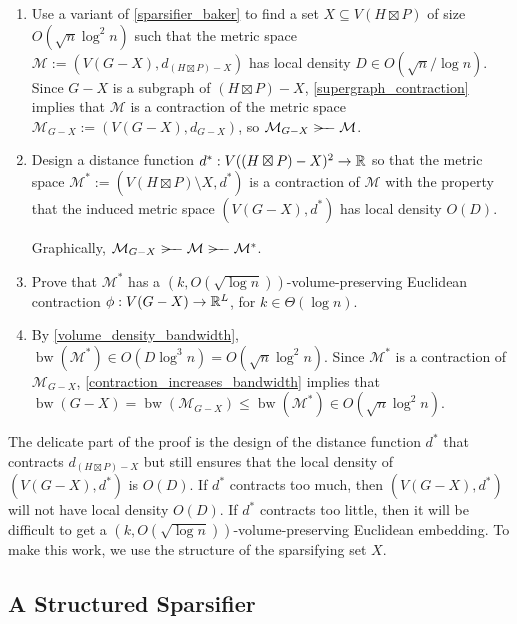 \documentclass{patmorin}
\renewcommand{\le}{\leqslant}
\newcommand{\david}[1]{{\color{orange} David: #1}}
\newcommand{\pat}[1]{\textcolor{Blue}{Pat: #1}}
\DeclareMathOperator{\bw}{bw}
\begin{document}
\begin{enumerate}
  \item Use a variant of \cref{sparsifier_baker} to find a set $X\subseteq V(H\boxtimes P)$ of size $O(\sqrt{n}\log^2 n)$ such that the metric space $\mathcal{M}:=(V(G-X),d_{(H\boxtimes P)-X})$ has local density $D\in O(\sqrt{n}/\log n)$.  Since $G-X$ is a subgraph of $(H\boxtimes P)-X$, \cref{supergraph_contraction} implies that $\mathcal{M}$ is a contraction of the metric space $\mathcal{M}_{G-X}:=(V(G-X),d_{G-X})$, so $\mathcal{M}_{G-X}\rightbroom\mathcal{M}$.

  \item Design a distance function $d^*:V((H\boxtimes P)-X)^2\to\mathbb{R}$ so that the metric space $\mathcal{M}^*:=(V(H\boxtimes P)\setminus X,d^*)$ is a contraction of $\mathcal{M}$ with the property that the induced metric space $(V(G-X),d^*)$ has local density $O(D)$.

  Graphically, $\mathcal{M}_{G-X}\rightbroom\mathcal{M}\rightbroom\mathcal{M}^*$.

  \item Prove that $\mathcal{M}^*$ has a $(k,O(\sqrt{\log n}))$-volume-preserving Euclidean contraction $\phi:V(G-X)\to\mathbb{R}^L$, for $k\in\Theta(\log n)$.

  \item  By \cref{volume_density_bandwidth},  $\bw(\mathcal{M}^*)\in O(D\log^3 n)=O(\sqrt{n}\log^2 n)$.  Since $\mathcal{M}^*$ is a contraction of $\mathcal{M}_{G-X}$, \cref{contraction_increases_bandwidth} implies that $\bw(G-X)=\bw(\mathcal{M}_{G-X}) \le \bw(\mathcal{M}^*)\in O(\sqrt{n}\log^2 n)$.
\end{enumerate}

The delicate part of the proof is the design of the distance function $d^*$ that contracts $d_{(H\boxtimes P)-X}$ but still ensures that the local density of $(V(G-X),d^*)$ is $O(D)$. If $d^*$ contracts too much, then $(V(G-X),d^*)$ will not have local density $O(D)$. If $d^*$ contracts too little, then it will be difficult to get a $(k,O(\sqrt{\log n}))$-volume-preserving Euclidean embedding. To make this work, we use the structure of the sparsifying set $X$.

\subsection{A Structured Sparsifier}
\label{x_definition}

\end{document}
